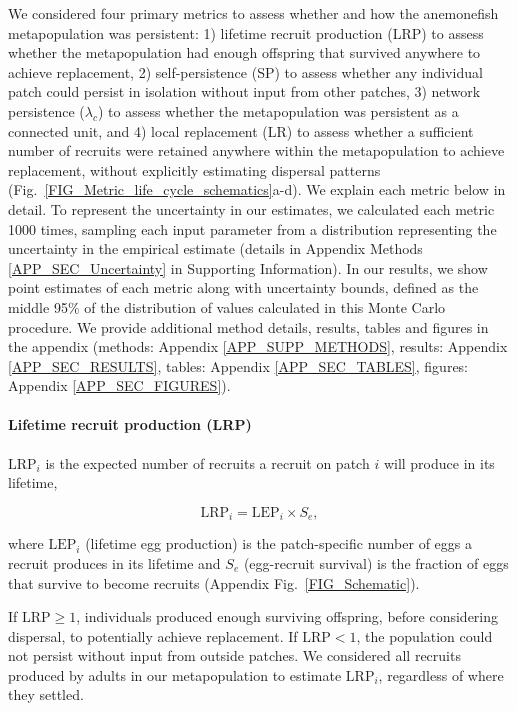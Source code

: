 \documentclass[12pt, oneside]{article}   	%
\begin{document}
We considered four primary metrics to assess whether and how the anemonefish metapopulation was persistent: 1) lifetime recruit production (LRP) to assess whether the metapopulation had enough offspring that survived anywhere to achieve replacement, 2) self-persistence (SP) to assess whether any individual patch could persist in isolation without input from other patches, 3) network persistence ($\lambda_c$) to assess whether the metapopulation was persistent as a connected unit, and 4) local replacement (LR) to assess whether a sufficient number of recruits were retained anywhere within the metapopulation to achieve replacement, without explicitly estimating dispersal patterns (Fig.\ \ref{FIG_Metric_life_cycle_schematics}a-d). We explain each metric below in detail. To represent the uncertainty in our estimates, we calculated each metric 1000 times, sampling each input parameter from a distribution representing the uncertainty in the empirical estimate (details in Appendix Methods \ref{APP_SEC_Uncertainty} in Supporting Information). In our results, we show point estimates of each metric along with uncertainty bounds, defined as the middle 95\% of the distribution of values calculated in this Monte Carlo procedure. We provide additional method details, results, tables and figures in the appendix (methods: Appendix \ref{APP_SUPP_METHODS}, results: Appendix \ref{APP_SEC_RESULTS}, tables: Appendix \ref{APP_SEC_TABLES}, figures: Appendix \ref{APP_SEC_FIGURES}).%

\paragraph*{Lifetime recruit production (LRP)}
$\text{LRP}_i$ is the expected number of recruits a recruit on patch $i$ will produce in its lifetime,

\begin{equation}
\text{LRP}_i = \text{LEP}_i \times S_e, \label{EQN_LRP}
\end{equation}

where $\text{LEP}_i$ (lifetime egg production) is the patch-specific number of eggs a recruit produces in its lifetime and $S_e$ (egg-recruit survival) is the fraction of eggs that survive to become recruits (Appendix Fig.\ \ref{FIG_Schematic}).

If $\text{LRP} \geq 1$, individuals produced enough surviving offspring, before considering dispersal, to potentially achieve replacement. If $\text{LRP} < 1$, the population could not persist without input from outside patches. We considered all recruits produced by adults in our metapopulation to estimate $\text{LRP}_i$, regardless of where they settled. 
\end{document}
